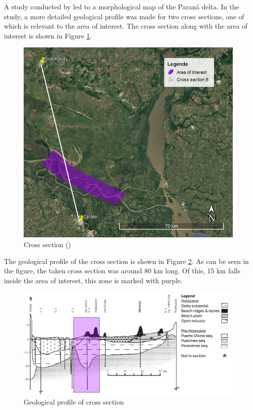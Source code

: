 A study conducted by \citeauthor{cavallottoEvolucionCambiosAmbientales2005} led to a morphological map of the Paraná delta. In the study, a more detailed geological profile was made for two cross sections, one of which is relevant to the area of interest. The cross section along with the area of interest is shown in Figure \ref{fig:crosssectiongeo}.

\begin{figure}[H]
    \centering
    \includegraphics[width=0.75\linewidth]{figures/ch9/CrossSectionB.png}
    \caption{Cross section (\autocite{google earth})}
    \label{fig:crosssectiongeo}
\end{figure}

The geological profile of the cross section is shown in Figure \ref{fig:geolprofile}. As can be seen in the figure, the taken cross section was around 80 km long. Of this, 15 km falls inside the area of interest, this zone is marked with purple.

\begin{figure}[H]
    \centering
    \includegraphics[width=0.75\linewidth]{figures/ch9/CrossSectionBResults.png}
    \caption{Geological profile of cross section \autocite{cavallottoEvolucionCambiosAmbientales2005}}
    \label{fig:geolprofile}
\end{figure}

